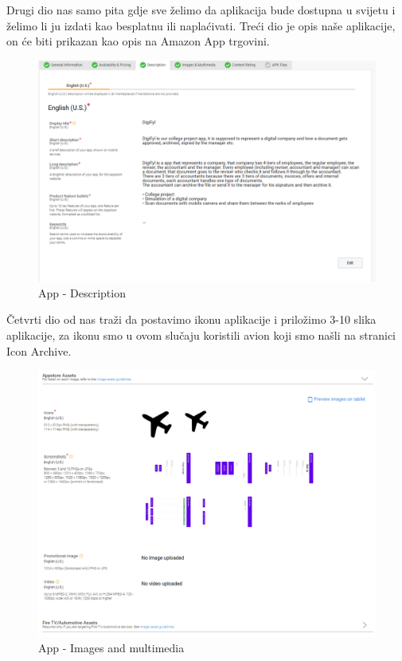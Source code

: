  	 	Drugi dio nas samo pita gdje sve želimo da aplikacija bude dostupna u svijetu i želimo li ju izdati kao besplatnu ili naplaćivati.\eject
 	 	Treći dio je opis naše aplikacije, on će biti prikazan kao opis na Amazon App trgovini.
 	 		 \begin{figure}[H]
 	 		\centering
 	 		\includegraphics[scale=0.55]{./slike/amzn3.png}
 	 		\caption{App - Description}
 	 		\label{fig:amzn3}
 	 	\end{figure}
  	\eject
  	Četvrti dio od nas traži da postavimo ikonu aplikacije i priložimo 3-10 slika aplikacije, za ikonu smo u ovom slučaju koristili avion koji smo našli na stranici Icon Archive.
  	 \begin{figure}[H]
  		\centering
  		\includegraphics[scale=0.55]{./slike/amzn4.png}
  		\caption{App - Images and multimedia}
  		\label{fig:amzn4}
  	\end{figure} \eject
  
